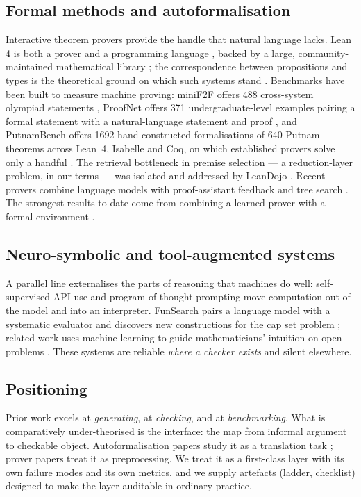 \documentclass[11pt,a4paper]{article}
\theoremstyle{plain}
\theoremstyle{remark}
\begin{document}
\subsection{Formal methods and autoformalisation}
Interactive theorem provers provide the handle that natural language lacks.
\textsf{Lean} 4 is both a prover and a programming language
\cite{moura2021lean4}, backed by a large, community-maintained mathematical
library \cite{mathlib2020}; the correspondence between propositions and types is
the theoretical ground on which such systems stand \cite{wadler2015propositions}.
Benchmarks have been built to measure machine proving: miniF2F offers 488
cross-system olympiad statements \cite{han2022minif2f}, ProofNet offers 371
undergraduate-level examples pairing a formal statement with a natural-language
statement and proof \cite{azerbayev2023proofnet}, and PutnamBench offers 1692
hand-constructed formalisations of 640 Putnam theorems across Lean~4, Isabelle
and Coq, on which established provers solve only a handful
\cite{tsoukalas2024putnambench}.  The retrieval bottleneck in premise selection
--- a reduction-layer problem, in our terms --- was isolated and addressed by
LeanDojo \cite{yang2023leandojo}.  Recent provers combine language models with
proof-assistant feedback and tree search \cite{xin2024deepseekprover}.  The
strongest results to date come from combining a learned prover with a formal
environment \cite{trinh2024alphageometry,hubert2025alphaproof}.

\subsection{Neuro-symbolic and tool-augmented systems}
A parallel line externalises the parts of reasoning that machines do well:
self-supervised API use \cite{schick2023toolformer} and program-of-thought
prompting \cite{chen2022pot} move computation out of the model and into an
interpreter.  FunSearch pairs a language model with a systematic evaluator and
discovers new constructions for the cap set problem
\cite{romera2024funsearch}; related work uses machine learning to guide
mathematicians' intuition on open problems \cite{davies2021guiding}.  These
systems are reliable \emph{where a checker exists} and silent elsewhere.

\subsection{Positioning}
Prior work excels at \emph{generating}, at \emph{checking}, and at
\emph{benchmarking}.  What is comparatively under-theorised is the interface:
the map from informal argument to checkable object.  Autoformalisation papers
study it as a translation task \cite{azerbayev2023proofnet}; prover papers
treat it as preprocessing.  We treat it as a first-class layer with its own
failure modes and its own metrics, and we supply artefacts (ladder, checklist)
designed to make the layer auditable in ordinary practice.
\end{document}
